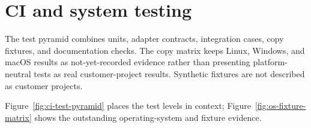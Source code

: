 \section{CI and system testing}
\label{chap:ci-system-testing}

The test pyramid combines units, adapter contracts, integration cases, copy fixtures, and
documentation checks. The copy matrix keeps Linux, Windows, and macOS results as
not-yet-recorded \Measured{} evidence rather than presenting platform-neutral tests as
real customer-project results. Synthetic fixtures are not described as customer projects.

Figure~\ref{fig:ci-test-pyramid} places the test levels in context; Figure~\ref{fig:os-fixture-matrix}
shows the outstanding operating-system and fixture evidence.

